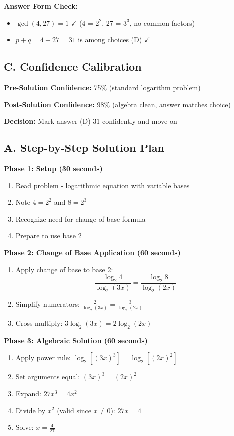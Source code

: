 \documentclass[12pt]{article}
\begin{document}
\begin{verificationbox}
\textbf{Answer Form Check:}
\begin{itemize}
    \item $\gcd(4, 27) = 1$ $\checkmark$ (4 = $2^2$, 27 = $3^3$, no common factors)
    \item $p + q = 4 + 27 = 31$ is among choices (D) $\checkmark$
\end{itemize}

\subsection*{C. Confidence Calibration}

\textbf{Pre-Solution Confidence:} 75\% (standard logarithm problem)

\textbf{Post-Solution Confidence:} 98\% (algebra clean, answer matches choice)

\textbf{Decision:} Mark answer (D) $31$ confidently and move on
\end{verificationbox}

\subsection*{A. Step-by-Step Solution Plan}

\textbf{Phase 1: Setup (30 seconds)}
\begin{enumerate}
    \item Read problem - logarithmic equation with variable bases
    \item Note $4 = 2^2$ and $8 = 2^3$
    \item Recognize need for change of base formula
    \item Prepare to use base 2
\end{enumerate}

\textbf{Phase 2: Change of Base Application (60 seconds)}
\begin{enumerate}
    \item Apply change of base to base 2:
    \[\frac{\log_2 4}{\log_2(3x)} = \frac{\log_2 8}{\log_2(2x)}\]
    \item Simplify numerators: $\frac{2}{\log_2(3x)} = \frac{3}{\log_2(2x)}$
    \item Cross-multiply: $3\log_2(3x) = 2\log_2(2x)$
\end{enumerate}

\textbf{Phase 3: Algebraic Solution (60 seconds)}
\begin{enumerate}
    \item Apply power rule: $\log_2[(3x)^3] = \log_2[(2x)^2]$
    \item Set arguments equal: $(3x)^3 = (2x)^2$
    \item Expand: $27x^3 = 4x^2$
    \item Divide by $x^2$ (valid since $x \neq 0$): $27x = 4$
    \item Solve: $x = \frac{4}{27}$
\end{enumerate}
\end{document}
